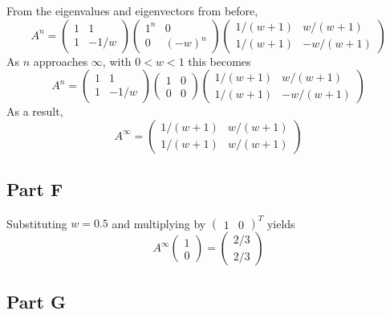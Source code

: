 \documentclass{article}
\begin{document}
From the eigenvalues and eigenvectors from before,
$$ A^n = \begin{pmatrix}
  1 & 1 \\
  1 & -1/w
\end{pmatrix} \begin{pmatrix}
  1^n & 0 \\
  0 & (-w)^n
\end{pmatrix} \begin{pmatrix}
  1/(w + 1) & w / (w + 1) \\
  1/(w + 1) & -w / (w + 1)
\end{pmatrix} $$
As $n$ approaches $\infty$, with $0 < w < 1$ this becomes
$$ A^n = \begin{pmatrix}
  1 & 1 \\
  1 & -1/w
\end{pmatrix} \begin{pmatrix}
  1 & 0 \\
  0 & 0
\end{pmatrix} \begin{pmatrix}
  1/(w + 1) & w / (w + 1) \\
  1/(w + 1) & -w / (w + 1)
\end{pmatrix} $$
As a result, 
$$ A^\infty = \begin{pmatrix}
  1/(w + 1) & w / (w + 1) \\
  1/(w + 1) & w / (w + 1)
\end{pmatrix} $$

\subsection*{Part F}

Substituting $w = 0.5$ and multiplying by $\begin{pmatrix} 1 & 0 \end{pmatrix}^T$ yields
$$ A^\infty \begin{pmatrix}
  1 \\
  0
\end{pmatrix} = \begin{pmatrix}
  2/3 \\
  2/3
\end{pmatrix} $$

\subsection*{Part G}
\end{document}
